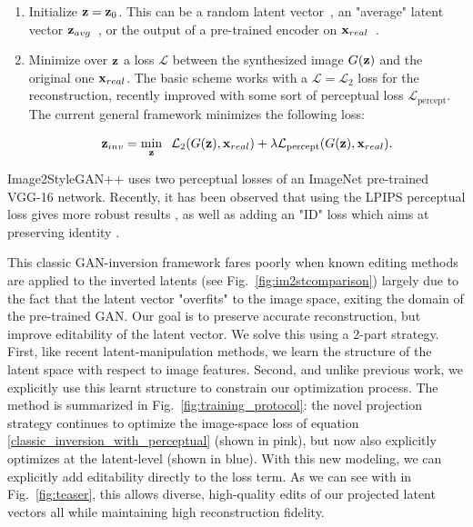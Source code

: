 \begin{enumerate}
    \item Initialize $\mathbf{z}=\mathbf{z}_0$. This can be a random latent vector~\citep{abdal2019image2stylegan}, 
    an "average" latent vector $\mathbf{z}_{avg}$~\citep{karra2019stylegan, abdal2019image2stylegan, abdal2020}, 
    or the output of a pre-trained encoder on $\mathbf{x}_{real}$~\citep{zhu2020indomain, zhu2016generative}.  
    
    \item Minimize over $\mathbf{z}$ a loss $\mathcal{L}$  between the synthesized image $G(\mathbf{z})$ and the 
    original one $\mathbf{x}_{real}$. The basic scheme works with a $\mathcal{L}=\mathcal{L}_2$ loss for the 
    reconstruction, recently improved with some sort of perceptual loss $\mathcal{L}_{\text{percept}}$. 
    The current general framework  minimizes the following loss:
    

\begin{equation}\label{classic_inversion_with_perceptual}
    \mathbf{z}_{inv}  = \min_{\mathbf{z}}\;\;  \mathcal{L}_2(G(\mathbf{z}), \mathbf{x}_{real}) +\lambda \mathcal{L}_{\text{percept}}(G(\mathbf{z}), \mathbf{x}_{real}). \end{equation}
\end{enumerate}

Image2StyleGAN++ \citep{abdal2020}
uses two perceptual losses of an ImageNet pre-trained VGG-16 network. Recently, it has been observed 
that using the LPIPS \citep{zhanglpips2018} perceptual loss gives more robust results 
\citep{collaborative_learning, psp}, as well as adding an "ID" loss which aims at preserving 
identity \citep{psp, e4e}.


This classic GAN-inversion framework fares poorly when known editing methods are applied to the 
inverted latents (see Fig.~\ref{fig:im2stcomparison}) largely due to the fact that the latent 
vector "overfits"
to the image space, exiting the domain of the pre-trained \ac{GAN}. Our goal is to preserve accurate reconstruction, but improve editability of the 
latent vector. We solve this using a 2-part strategy. First, like recent latent-manipulation methods, 
we learn the structure of the latent space with respect to image features. Second, and unlike previous
 work, we explicitly use this learnt structure to constrain our optimization process. The method is
  summarized in Fig.~\ref{fig:training_protocol}: the novel projection strategy continues to optimize
   the image-space loss of equation \ref{classic_inversion_with_perceptual} (shown in pink), but now 
   also explicitly optimizes at the latent-level (shown in blue). With this new modeling, we can 
   explicitly add editability directly to the loss term. As we can see with in Fig.~\ref{fig:teaser},
    this allows diverse, high-quality edits of our projected latent vectors all while maintaining
     high reconstruction fidelity. 



